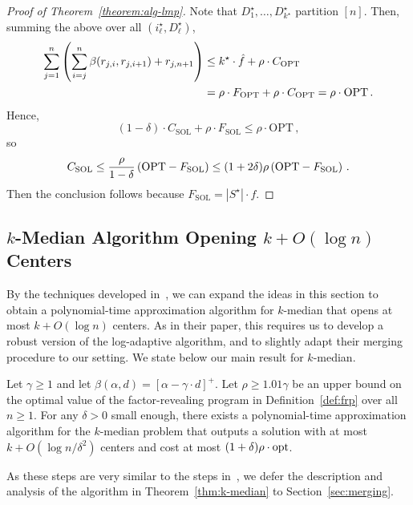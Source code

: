 \begin{proof}[Proof of Theorem~\ref{theorem:alg-lmp}]
    Note that $D_1^\star, \ldots, D^\star_{k^\star}$ partition $[n]$. Then, summing the above over all $(i_{\ell}^\star, D^\star_{\ell})$,
    \begin{align*}
    \sum_{j=1}^n \left(\sum_{i=j}^{n} \beta(r_{j,i}, r_{j,i+1}) + r_{j,n+1}\right)
    &\leq k^\star \cdot \hat{f} + \rho \cdot C_{\mathrm{OPT}}\\
    &= \rho \cdot F_{\mathrm{OPT}} + \rho \cdot C_{\mathrm{OPT}}
    = \rho \cdot \mathrm{OPT}\,.
    \end{align*}
    Hence, 
    \[(1-\delta) \cdot C_{\mathrm{SOL}} + \rho \cdot F_{\mathrm{SOL}} \leq \rho \cdot \mathrm{OPT}\,,\]
    so 
    \[C_{\mathrm{SOL}} \leq \frac{\rho}{1-\delta} \left(\mathrm{OPT} - F_{\mathrm{SOL}}\right) \leq (1+2\delta) \rho \left(\mathrm{OPT} - F_{\mathrm{SOL}}\right)\,.\]
    Then the conclusion follows because $F_{\mathrm{SOL}} = |S^\star| \cdot f$.
\end{proof}

\subsection{$k$-Median Algorithm Opening $k + O(\log n)$ Centers}
\label{subsec:k-median}

By the techniques developed in~\cite{MR4928455-Cohen25}, we can expand the ideas in this section to obtain a polynomial-time approximation algorithm for $k$-median that opens at most $k + O(\log n)$ centers.
As in their paper, this requires us to develop a robust version of the log-adaptive algorithm, and to slightly adapt their merging procedure to our setting.
We state below our main result for $k$-median.

\begin{theorem}
\label{thm:k-median}
Let $\gamma \geq 1$ and let $\beta(\alpha,d) = [\alpha - \gamma \cdot d]^+$. Let $\rho \geq 1.01 \gamma$ be an upper bound on the optimal value of the factor-revealing program in Definition~\ref{def:frp} over all $n \geq 1$.
For any $\delta > 0$ small enough, there exists a polynomial-time approximation algorithm for the $k$-median problem that outputs a solution with at most $k + O(\log n / \delta^2)$ centers and cost at most $(1+\delta)\rho \cdot \mathrm{opt}$.
\end{theorem}

As these steps are very similar to the steps in~\cite{MR4928455-Cohen25}, we defer the description and analysis of the algorithm in Theorem~\ref{thm:k-median} to Section~\ref{sec:merging}.
